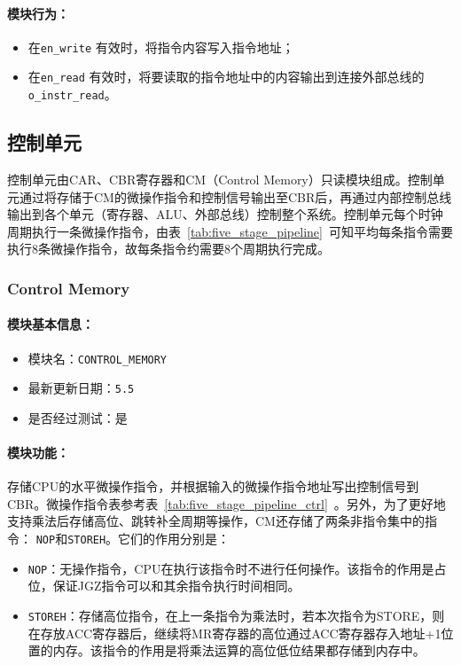 \documentclass[lang=cn,a4paper,newtx]{elegantpaper}
\begin{document}
\paragraph{模块行为：}
\begin{itemize}
  \item 在\texttt{en\_write} 有效时，将指令内容写入指令地址；
  \item 在\texttt{en\_read} 有效时，将要读取的指令地址中的内容输出到连接外部总线的\texttt{o\_instr\_read}。
\end{itemize}


\subsection{控制单元}
控制单元由CAR、CBR寄存器和CM（Control Memory）只读模块组成。控制单元通过将存储于CM的微操作指令和控制信号输出至CBR后，再通过内部控制总线输出到各个单元（寄存器、ALU、外部总线）控制整个系统。控制单元每个时钟周期执行一条微操作指令，由表~\ref{tab:five_stage_pipeline}~可知平均每条指令需要执行8条微操作指令，故每条指令约需要8个周期执行完成。
\subsubsection{Control Memory}\label{sec:ControlMemory}
\paragraph{模块基本信息：}
\begin{itemize}
  \item 模块名：\texttt{CONTROL\_MEMORY}
  \item 最新更新日期：\texttt{5.5}
  \item 是否经过测试：是
\end{itemize}
\paragraph{模块功能：}
存储CPU的水平微操作指令，并根据输入的微操作指令地址写出控制信号到CBR。微操作指令表参考表~\ref{tab:five_stage_pipeline_ctrl}~。另外，为了更好地支持乘法后存储高位、跳转补全周期等操作，CM还存储了两条非指令集中的指令：
\texttt{NOP}和\texttt{STOREH}。它们的作用分别是：
\begin{itemize}
  \item \texttt{NOP}：无操作指令，CPU在执行该指令时不进行任何操作。该指令的作用是占位，保证JGZ指令可以和其余指令执行时间相同。
  \item \texttt{STOREH}：存储高位指令，在上一条指令为乘法时，若本次指令为STORE，则在存放ACC寄存器后，继续将MR寄存器的高位通过ACC寄存器存入地址+1位置的内存。该指令的作用是将乘法运算的高位低位结果都存储到内存中。
\end{itemize}
\end{document}

